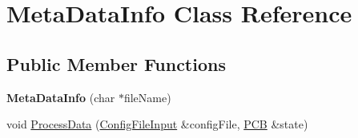 \hypertarget{class_meta_data_info}{}\section{Meta\+Data\+Info Class Reference}
\label{class_meta_data_info}
\subsection*{Public Member Functions}
\begin{DoxyCompactItemize}
\item 
{\bfseries Meta\+Data\+Info} (char $\ast$file\+Name)\hypertarget{class_meta_data_info_af98d5c5b43cd3bcd86438554ea91751e}{}\label{class_meta_data_info_af98d5c5b43cd3bcd86438554ea91751e}

\item 
void \hyperlink{class_meta_data_info_a9ff5c26cf9387410fc7326bde2b05e1d}{Process\+Data} (\hyperlink{class_config_file_input}{Config\+File\+Input} \&config\+File, \hyperlink{class_p_c_b}{P\+CB} \&state)
\end{DoxyCompactItemize}
